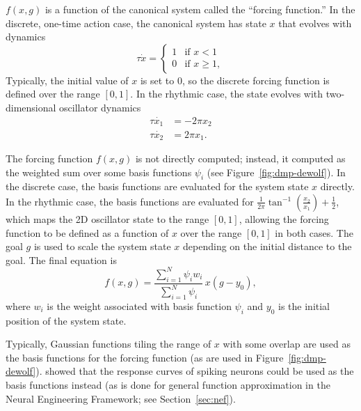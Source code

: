 $f(x, g)$ is a function
of the canonical system
called the ``forcing function.''
In the discrete, one-time action case,
the canonical system
has state $x$ that evolves
with dynamics
\begin{equation}
  \label{dmp-discrete}
  \tau\dot{x} =
  \begin{cases}
    1 &\text{if } x < 1 \\
    0 &\text{if } x \ge 1,
  \end{cases}
\end{equation}
Typically, the initial value of $x$
is set to 0,
so the discrete forcing function
is defined over the range $[0, 1]$.
In the rhythmic case,
the state evolves with
two-dimensional oscillator dynamics
\begin{align}
  \tau \dot{x_1} &= -2 \pi x_2 \nonumber \\
  \tau \dot{x_2} &= 2 \pi x_1.
  \label{dmp-rhythmic}
\end{align}


The forcing function $f(x, g)$ is
not directly computed;
instead, it computed as the weighted sum
over some basis functions $\psi_i$
(see Figure~\ref{fig:dmp-dewolf}).
In the discrete case,
the basis functions are evaluated
for the system state $x$ directly.
In the rhythmic case,
the basis functions are evaluated for
$\textstyle \frac{1}{2\pi}\tan^{-1}\left(\frac{x_2}{x_1}\right)+ \frac{1}{2}$,
which maps the 2D oscillator state
to the range $[0, 1]$,
allowing the forcing function to be defined
as a function of $x$ over the range $[0, 1]$
in both cases.
The goal $g$ is used
to scale the system state $x$ depending on
the initial distance to the goal.
The final equation is
\begin{equation}
  \label{dmp-forcing-func}
  f(x, g) = \frac{\sum_{i=1}^N \psi_i w_i}{\sum_{i=1}^N \psi_i} \, x(g - y_0),
\end{equation}
where $w_i$ is the weight associated with
basis function $\psi_i$ and $y_0$
is the initial position of
the system state.

Typically, Gaussian functions
tiling the range of $x$ with some overlap
are used as the basis functions
for the forcing function
(as are used in Figure~\ref{fig:dmp-dewolf}).
\citet{dewolf2015} showed that
the response curves of spiking neurons
could be used as the
basis functions instead
(as is done for general function approximation
in the Neural Engineering Framework;
see Section~\ref{sec:nef}).

